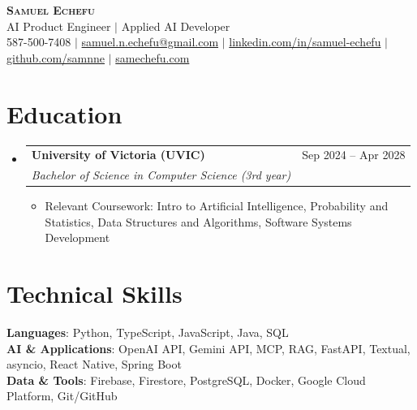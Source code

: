 \documentclass[letterpaper,10pt]{article}
\makeatletter
\newcommand{\resumeItem}[1]{
  \item\small{
    {#1 \vspace{-1pt}}
  }
}
\newcommand{\resumeSubheading}[4]{
  \vspace{-2pt}\item
    \begin{tabular*}{0.97\textwidth}[t]{l@{\extracolsep{\fill}}r}
      \textbf{#1} & #2 \\
      \textit{\small#3} & \textit{\small #4} \\
    \end{tabular*}\vspace{-6pt}
}
\newcommand{\resumeSubHeadingListStart}{\begin{itemize}[leftmargin=0.15in, label={}]}
\newcommand{\resumeSubHeadingListEnd}{\end{itemize}}
\newcommand{\resumeItemListStart}{\begin{itemize}[label=$\bullet$, itemsep=1.80pt, topsep=0pt, parsep=0pt]}
\newcommand{\resumeItemListEnd}{\end{itemize}\vspace{-2pt}}
\makeatother
\begin{document}
\begin{center}
    \textbf{\Huge \scshape Samuel Echefu} \\ \vspace{3pt}
    \small AI Product Engineer $|$ Applied AI Developer \\ \vspace{3pt}
    \small 587-500-7408 $|$ \href{mailto:samuel.n.echefu@gmail.com}{samuel.n.echefu@gmail.com} $|$ 
    \href{https://linkedin.com/in/samuel-echefu-251a21336}{linkedin.com/in/samuel-echefu} $|$
    \href{https://github.com/samnne}{github.com/samnne} $|$
    \href{https://samechefu.com}{samechefu.com}
\end{center}


\section{Education}
\resumeSubHeadingListStart
\resumeSubheading{University of Victoria (UVIC)}{Sep 2024 -- Apr 2028}{Bachelor of Science in Computer Science (3rd year)}{}
\resumeItemListStart
  \resumeItem{Relevant Coursework: Intro to Artificial Intelligence, Probability and Statistics, Data Structures and Algorithms, Software Systems Development}
\resumeItemListEnd
\resumeSubHeadingListEnd

\section{Technical Skills}
 \begin{itemize}[leftmargin=0.15in, label={}]
    \small{\item{
     \textbf{Languages}{: Python, TypeScript, JavaScript, Java, SQL} \\ \vspace{0pt}
     \textbf{AI \& Applications}{: OpenAI API, Gemini API, MCP, RAG, FastAPI, Textual, asyncio, React Native, Spring Boot} \\ \vspace{0pt}
     \textbf{Data \& Tools}{: Firebase, Firestore, PostgreSQL, Docker, Google Cloud Platform, Git/GitHub}
    }}
 \end{itemize}
\end{document}
